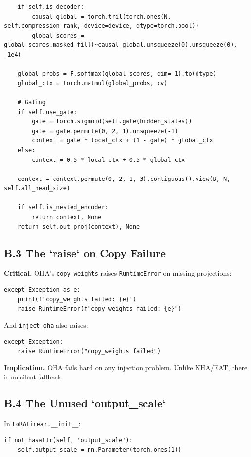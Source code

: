 \begin{lstlisting}
    if self.is_decoder:
        causal_global = torch.tril(torch.ones(N, self.compression_rank, device=device, dtype=torch.bool))
        global_scores = global_scores.masked_fill(~causal_global.unsqueeze(0).unsqueeze(0), -1e4)
    
    global_probs = F.softmax(global_scores, dim=-1).to(dtype)
    global_ctx = torch.matmul(global_probs, cv)
    
    # Gating
    if self.use_gate:
        gate = torch.sigmoid(self.gate(hidden_states))
        gate = gate.permute(0, 2, 1).unsqueeze(-1)
        context = gate * local_ctx + (1 - gate) * global_ctx
    else:
        context = 0.5 * local_ctx + 0.5 * global_ctx
    
    context = context.permute(0, 2, 1, 3).contiguous().view(B, N, self.all_head_size)
    
    if self.is_nested_encoder:
        return context, None
    return self.out_proj(context), None
\end{lstlisting}

\subsection{B.3 The `raise` on Copy Failure}

\textbf{Critical.} OHA's \texttt{copy\_weights} raises \texttt{RuntimeError} on missing projections:

\begin{lstlisting}
except Exception as e:
    print(f'copy_weights failed: {e}')
    raise RuntimeError(f"copy_weights failed: {e}")
\end{lstlisting}

And \texttt{inject\_oha} also raises:

\begin{lstlisting}
except Exception:
    raise RuntimeError("copy_weights failed")
\end{lstlisting}

\textbf{Implication.} OHA fails hard on any injection problem. Unlike NHA/EAT, 
there is no silent fallback.

\subsection{B.4 The Unused `output\_scale`}

In \texttt{LoRALinear.\_\_init\_\_}:

\begin{lstlisting}
if not hasattr(self, 'output_scale'):
    self.output_scale = nn.Parameter(torch.ones(1))
\end{lstlisting}

